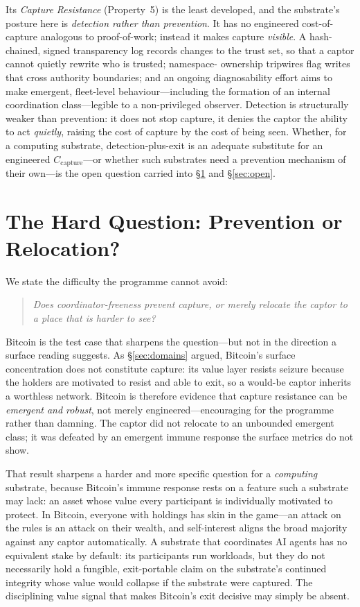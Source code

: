 \documentclass[11pt]{article}
\theoremstyle{definition}
\theoremstyle{plain}
\begin{document}
Its \emph{Capture Resistance} (Property~5) is the least developed, and the
substrate's posture here is \emph{detection rather than prevention}. It has no
engineered cost-of-capture analogous to proof-of-work; instead it makes capture
\emph{visible}. A hash-chained, signed transparency log records changes to the
trust set, so that a captor cannot quietly rewrite who is trusted; namespace-
ownership tripwires flag writes that cross authority boundaries; and an ongoing
diagnosability effort aims to make emergent, fleet-level behaviour---including the
formation of an internal coordination class---legible to a non-privileged observer.
Detection is structurally weaker than prevention: it does not stop capture, it
denies the captor the ability to act \emph{quietly}, raising the cost of capture by
the cost of being seen. Whether, for a computing substrate, detection-plus-exit is
an adequate substitute for an engineered $C_{\text{capture}}$---or whether such
substrates need a prevention mechanism of their own---is the open question carried
into \S\ref{sec:hard} and \S\ref{sec:open}.

\section{The Hard Question: Prevention or Relocation?}
\label{sec:hard}

We state the difficulty the programme cannot avoid:

\begin{quote}
\emph{Does coordinator-freeness prevent capture, or merely relocate the captor to a
place that is harder to see?}
\end{quote}

Bitcoin is the test case that sharpens the question---but not in the direction a
surface reading suggests. As \S\ref{sec:domains} argued, Bitcoin's surface
concentration does not constitute capture: its value layer resists seizure because
the holders are motivated to resist and able to exit, so a would-be captor inherits
a worthless network. Bitcoin is therefore evidence that capture resistance can be
\emph{emergent and robust}, not merely engineered---encouraging for the programme
rather than damning. The captor did not relocate to an unbounded emergent class; it
was defeated by an emergent immune response the surface metrics do not show.

That result sharpens a harder and more specific question for a \emph{computing}
substrate, because Bitcoin's immune response rests on a feature such a substrate may
lack: an asset whose value every participant is individually motivated to protect.
In Bitcoin, everyone with holdings has skin in the game---an attack on the rules is
an attack on their wealth, and self-interest aligns the broad majority against any
captor automatically. A substrate that coordinates AI agents has no equivalent stake
by default: its participants run workloads, but they do not necessarily hold a
fungible, exit-portable claim on the substrate's continued integrity whose value
would collapse if the substrate were captured. The disciplining value signal that
makes Bitcoin's exit decisive may simply be absent.
\end{document}
